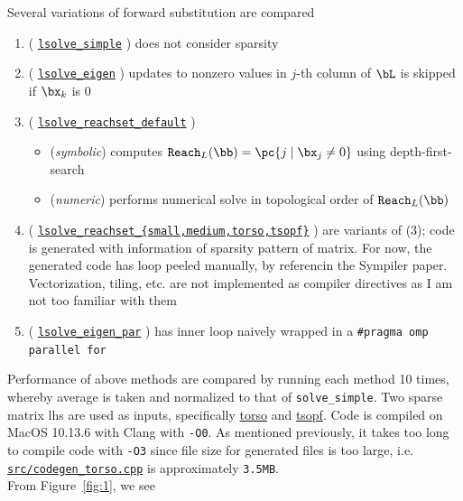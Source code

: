 \documentclass[12pt]{article}
\newcommand{\lgh}[1]{
    \href{https://github.com/tt6746690/sparse_solver/blob/master/#1}{\texttt{#1}}
}
\newcommand{\lghh}[2]{
    \href{https://github.com/tt6746690/sparse_solver/blob/master/#1}{\texttt{#2}}
}
\begin{document}
Several variations of forward substitution are compared
\begin{enumerate}
    \item (\lghh{src/triangular.h\#L45}{lsolve\_simple}) does not consider sparsity
    \item (\lghh{src/triangular.h\#L48}{lsolve\_eigen}) updates to nonzero values in $j$-th column of $\bL$ is skipped if $\bx_k$ is 0
    \item (\lghh{src/triangular.h\#L51}{lsolve\_reachset\_default})
    \begin{itemize}
        \item (\textit{symbolic}) computes $\texttt{Reach}_L(\bb) = \pc{j \mid \bx_j \neq 0}$ using depth-first-search
        \item (\textit{numeric}) performs numerical solve in topological order of $\texttt{Reach}_L(\bb)$
    \end{itemize}
    \item (\lghh{src/triangular.h\#L55}{lsolve\_reachset\_\{small,medium,torso,tsopf\}}) are variants of (3); code is generated with information of sparsity pattern of matrix. For now, the generated code has loop peeled manually, by referencin the Sympiler paper. Vectorization, tiling, etc. are not implemented as compiler directives as I am not too familiar with them
    \item (\lghh{src/triangular.h\#L69}{lsolve\_eigen\_par}) has inner loop naively wrapped in a \texttt{\#pragma omp parallel for}
\end{enumerate}
Performance of above methods are compared by running each method 10 times, whereby average is taken and normalized to that of \texttt{solve\_simple}. Two sparse matrix lhs are used as inputs, specifically \href{https://sparse.tamu.edu/Norris/torso1}{torso} and \href{https://sparse.tamu.edu/TSOPF/TSOPF_RS_b678_c2}{tsopf}. Code is compiled on MacOS 10.13.6 with Clang with \texttt{-O0}. As mentioned previously, it takes too long to compile code with \texttt{-O3} since file size for generated files is too large, i.e. \lgh{src/codegen\_torso.cpp} is approximately \texttt{3.5MB}. \\
From Figure~\ref{fig:1}, we see 
\end{document}
